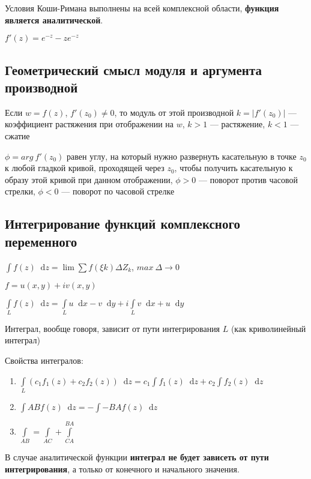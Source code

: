 \documentclass{article}
\newcommand*\diff{\mathop{}\!\mathrm{d}}
\begin{document}
Условия Коши-Римана выполнены на всей комплексной области, \textbf{функция является аналитической}.

$f'(z) = e^{- z} - z e^{-z}$

\subsection{Геометрический смысл модуля и аргумента производной}

Если $w = f(z)$, $f'(z_0) \ne 0$, то модуль от этой производной $k = |f'(z_0)|$ — коэффициент растяжения при отображении на $w$, $k > 1$ — растяжение, $k < 1$ — сжатие

$\phi = arg \ f'(z_0)$ равен углу, на который нужно развернуть касательную в точке $z_0$ к любой гладкой кривой, проходящей через $z_0$, чтобы получить касательную к образу этой кривой при данном отображении, $\phi > 0$ — поворот против часовой стрелки, $\phi < 0$ — поворот по часовой стрелке

\subsection{Интегрирование функций комплексного переменного}

$\int f(z) \diff z = \lim \sum f(\xi k) \Delta Z_{k}$, $max \ \Delta \to 0$

\hfill

$f = u (x, y) + i v (x, y)$

$\int\limits_{L} f(z) \diff z = \int\limits_{L} u \diff x - v \diff y + i \int\limits_{L} v \diff x + u \diff y$

Интеграл, вообще говоря, зависит от пути интегрирования $L$ (как криволинейный интеграл)

\hfill

Свойства интегралов:

\begin{enumerate}
    \item $\int\limits_{L} (c_1 f_1 (z) + c_2 f_2 (z)) \diff z = c_1 \int f_1 (z) \diff z + c_2 \int f_2(z) \diff z$
    \item $\int\limits{A B} f(z) \diff z = - \int\limits-{B A} f(z) \diff z$
    \item $\int\limits_{A B} = \int\limits_{A C} + \int\limits_{C A}^{B A}$
\end{enumerate}

В случае аналитической функции \textbf{интеграл не будет зависеть от пути интегрирования}, а только от конечного и начального значения.
\end{document}
